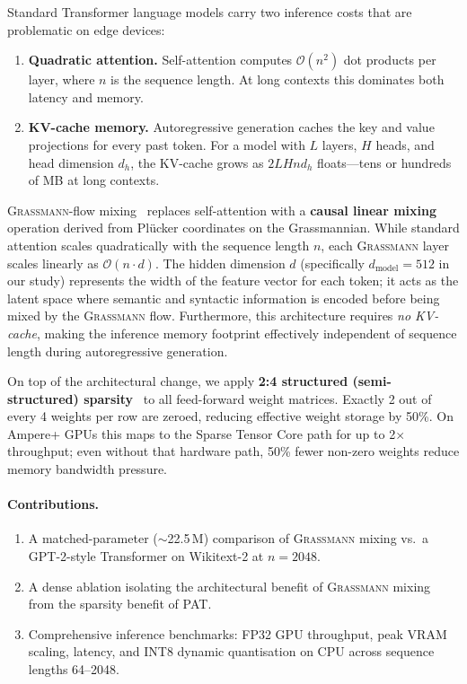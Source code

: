 \documentclass[conference]{IEEEtran}
\newcommand{\grassmann}{\textsc{Grassmann}}
\newcommand{\pat}{\textsc{PAT}}
\newcommand{\bigO}[1]{\ensuremath{\mathcal{O}(#1)}}
\begin{document}
Standard Transformer language models carry two inference costs that are
problematic on edge devices:

\begin{enumerate}[leftmargin=*,topsep=3pt,itemsep=2pt]
  \item \textbf{Quadratic attention.} Self-attention computes
        $\bigO{n^{2}}$ dot products per layer, where $n$ is the
        sequence length. At long contexts this dominates both latency
        and memory.
  \item \textbf{KV-cache memory.} Autoregressive generation caches the
        key and value projections for every past token. For a model
        with $L$ layers, $H$ heads, and head dimension $d_h$, the
        KV-cache grows as $2 L H n d_h$ floats—tens or hundreds of MB
        at long contexts.
\end{enumerate}

\grassmann{}-flow mixing~\cite{grassmann2024} replaces self-attention
with a \textbf{causal linear mixing} operation derived from Pl\"ucker
coordinates on the Grassmannian. While standard attention scales quadratically
with the sequence length $n$, each \grassmann{} layer scales linearly as
\bigO{n \cdot d}. The hidden dimension $d$ (specifically $d_{\text{model}} = 512$ in our study)
represents the width of the feature vector for each token; it acts as the
latent space where semantic and syntactic information is encoded before
being mixed by the \grassmann{} flow.
Furthermore, this architecture requires \emph{no KV-cache}, making the
inference memory footprint effectively independent of sequence length
during autoregressive generation.

On top of the architectural change, we apply \textbf{2:4 structured
(semi-structured) sparsity}~\cite{nvidia2to4} to all feed-forward weight
matrices. Exactly 2 out of every 4 weights per row are zeroed, reducing
effective weight storage by 50\%. On Ampere+ GPUs this maps to the
Sparse Tensor Core path for up to 2$\times$ throughput; even without
that hardware path, 50\% fewer non-zero weights reduce memory bandwidth
pressure.

\paragraph{Contributions.}
\begin{enumerate}[leftmargin=*,topsep=3pt,itemsep=2pt]
  \item A matched-parameter ($\sim$22.5\,M) comparison of \grassmann{}
        mixing vs.\ a GPT-2-style Transformer on Wikitext-2 at
        $n = 2048$.
  \item A dense ablation isolating the architectural benefit of
        \grassmann{} mixing from the sparsity benefit of \pat{}.
  \item Comprehensive inference benchmarks: FP32 GPU throughput, peak
        VRAM scaling, latency, and INT8 dynamic quantisation on CPU
        across sequence lengths 64--2048.
\end{enumerate}
\end{document}
